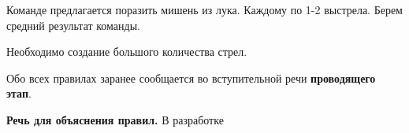 
\par Команде предлагается поразить мишень из лука. Каждому по 1-2 выстрела. Берем средний результат команды.

\par Необходимо создание большого количества стрел.

\par Обо всех правилах заранее сообщается во вступительной речи \textbf{проводящего этап}.

\par \textbf{Речь для объяснения правил.} В разработке